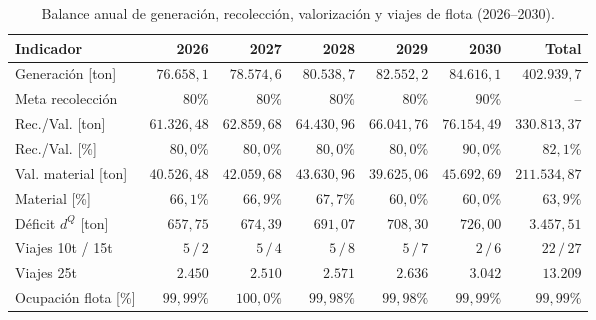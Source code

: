 \documentclass[letterpaper]{article}
\begin{document}
\begin{table}[H]
\centering
\caption{Balance anual de generación, recolección, valorización y viajes de flota (2026--2030).}
\label{tab:balance_anual}
\small
\setlength{\tabcolsep}{3pt}
\begin{tabularx}{\linewidth}{@{}>{\raggedright\arraybackslash}Xrrrrrr@{}}
\hline
\textbf{Indicador} & \textbf{2026} & \textbf{2027} & \textbf{2028} & \textbf{2029} & \textbf{2030} & \textbf{Total} \\
\hline
Generación [ton] & $76.658,1$ & $78.574,6$ & $80.538,7$ & $82.552,2$ & $84.616,1$ & $402.939,7$ \\
Meta recolección & $80\%$ & $80\%$ & $80\%$ & $80\%$ & $90\%$ & -- \\
Rec./Val. [ton] & $61.326,48$ & $62.859,68$ & $64.430,96$ & $66.041,76$ & $76.154,49$ & $330.813,37$ \\
Rec./Val. [\%] & $80,0\%$ & $80,0\%$ & $80,0\%$ & $80,0\%$ & $90,0\%$ & $82,1\%$ \\
Val. material [ton] & $40.526,48$ & $42.059,68$ & $43.630,96$ & $39.625,06$ & $45.692,69$ & $211.534,87$ \\
Material [\%] & $66,1\%$ & $66,9\%$ & $67,7\%$ & $60,0\%$ & $60,0\%$ & $63,9\%$ \\
Déficit $d^{Q}$ [ton] & $657,75$ & $674,39$ & $691,07$ & $708,30$ & $726,00$ & $3.457,51$ \\
Viajes 10t / 15t & $5\,/\,2$ & $5\,/\,4$ & $5\,/\,8$ & $5\,/\,7$ & $2\,/\,6$ & $22\,/\,27$ \\
Viajes 25t & $2.450$ & $2.510$ & $2.571$ & $2.636$ & $3.042$ & $13.209$ \\
Ocupación flota [\%] & $99,99\%$ & $100,0\%$ & $99,98\%$ & $99,98\%$ & $99,99\%$ & $99,99\%$ \\
\hline
\end{tabularx}
\end{table}
\end{document}
